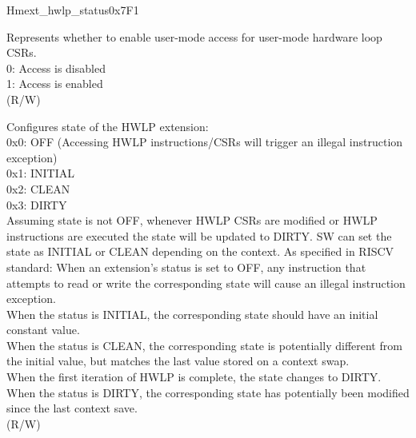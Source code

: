 \begin{register}{H}{mext\_hwlp\_status}{0x7F1}\label{regdesc:MEXT_HWLP_STATUS}
%
%
%
\regnewline%
\begin{regdesc}\begin{reglist}
\label{fielddesc:MEXT_HWLP_URW}\item [URW] Represents whether to enable user-mode access for user-mode hardware loop CSRs. \\
0: Access is disabled\\
1: Access is enabled\\
(R/W)
\label{fielddesc:MEXT_HWLP_STATE}\item [STATE] Configures state of the HWLP extension: \\
0x0: OFF (Accessing HWLP instructions/CSRs will trigger an illegal instruction exception) \\
0x1: INITIAL \\
0x2: CLEAN \\
0x3: DIRTY \\
Assuming state is not OFF, whenever HWLP CSRs are modified or HWLP instructions are executed the state will be updated to DIRTY. SW can set the state as INITIAL or CLEAN depending on the context. As specified in RISCV standard: When an extension’s status is set to OFF, any instruction that attempts to read or write the corresponding state will cause an illegal instruction exception. \\
When the status is INITIAL, the corresponding state should have an initial constant value. \\
When the status is CLEAN, the corresponding state is potentially different from the initial value, but matches the last value stored on a context swap.\\
When the first iteration of HWLP is complete, the state changes to DIRTY. When the status is DIRTY, the corresponding state has potentially been modified since the last context save. \\ 
(R/W)
\end{reglist}\end{regdesc}
\end{register}

